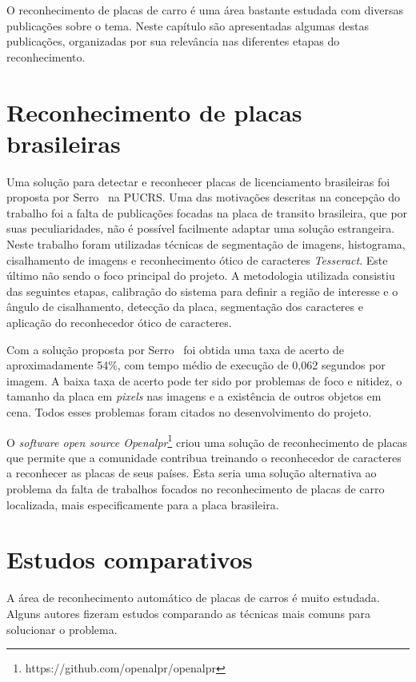O reconhecimento de placas de carro é uma área bastante estudada com diversas publicações sobre o tema. Neste capítulo são apresentadas algumas destas publicações, organizadas por sua relevância nas diferentes etapas do reconhecimento.

\section{Reconhecimento de placas brasileiras}

Uma solução para detectar e reconhecer placas de licenciamento brasileiras foi
proposta por Serro~\cite{serro2012deteccao} na PUCRS\@. Uma das motivações descritas na concepção do trabalho foi a falta de publicações focadas na placa de transito brasileira, que por suas peculiaridades, não é possível facilmente adaptar uma solução estrangeira. Neste trabalho foram
utilizadas técnicas de segmentação de imagens, histograma, cisalhamento de
imagens e reconhecimento ótico de caracteres \emph{Tesseract}. Este último não sendo o foco principal do projeto. A metodologia utilizada consistiu das
seguintes etapas, calibração do sistema
para definir a região de interesse e o ângulo de cisalhamento, detecção da
placa, segmentação dos caracteres e aplicação do reconhecedor ótico de
caracteres.

Com a solução proposta por Serro~\cite{serro2012deteccao}  foi obtida uma taxa de
acerto de aproximadamente 54\%, com tempo médio de execução de 0,062 segundos por imagem.
A baixa taxa de acerto pode ter sido por problemas de foco e nitidez, o tamanho da placa em
\emph{pixels} nas imagens e a existência de outros objetos em cena. Todos esses
problemas foram citados no desenvolvimento do projeto.

O \emph{software open source Openalpr}\footnote{https://github.com/openalpr/openalpr}
criou uma solução de reconhecimento de placas que permite que a comunidade contribua
treinando o reconhecedor de caracteres a reconhecer as placas de seus países. Esta seria uma solução alternativa ao problema da falta de trabalhos focados no reconhecimento de placas de carro localizada, mais especificamente para a placa brasileira.

\section{Estudos comparativos}

A área de reconhecimento automático de placas de carros é muito  estudada. Alguns autores fizeram estudos comparando as técnicas mais comuns para solucionar o problema.

